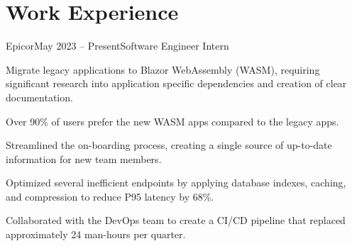 \documentclass[letterpaper,11pt]{article}
\begin{document}
\section{Work Experience}
\begin{entries}
    \item\begin{experience}{Epicor}{May 2023 -- Present}{Software Engineer Intern}{}
        \item Migrate legacy applications to Blazor WebAssembly (WASM), requiring
            significant research into application specific dependencies and
            creation of clear documentation.
        \item Over 90\% of users prefer the new WASM apps compared to the legacy
            apps.
        \item Streamlined the on-boarding process, creating a single source of
            up-to-date information for new team members.
        \item Optimized several inefficient endpoints by applying database indexes,
            caching, and compression to reduce P95 latency by 68\%.
        \item Collaborated with the DevOps team to create a CI/CD pipeline that
            replaced approximately 24 man-hours per quarter.
    \end{experience}
\end{entries}


\end{document}
